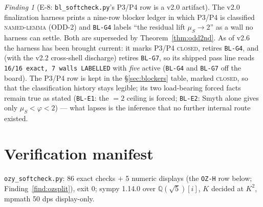 \documentclass[11pt]{article}
\newcommand{\hx}[1]{\textcolor{cC}{\footnotesize\texttt{#1}}}
\newcommand{\Q}{\mathbb{Q}}
\newcommand{\gp}{\varphi}
\theoremstyle{plain}
\theoremstyle{definition}
\theoremstyle{remark}
\newtheorem{finding}[theorem]{Finding}
\begin{document}
\begin{finding}[E-8: \texttt{bl\_softcheck.py}'s P3/P4 row is a v2.0 artifact]\label{find:blstale}
The v2.0 finalization harness prints a nine-row blocker ledger in which P3/P4 is
classified \textsc{named-lemma} (ODD-2) and \hx{BL-G4} labels ``the residual
lift $\mu_S\to2$'' as a wall no harness can settle. Both are superseded by
Theorem~\ref{thm:odd2nd}. As of v2.6 the harness has been brought current: it
marks P3/P4 \textsc{closed}, retires \hx{BL-G4}, and (with the v2.2 cross-shell
discharge) retires \hx{BL-G7}, so its shipped pass line reads \texttt{16/16
exact, 7 walls LABELLED} with \emph{five} active (\hx{BL-G4} and \hx{BL-G7} off
the board). The P3/P4 row is kept in the \S\ref{sec:blockers} table, marked
\textsc{closed}, so that the classification history stays legible; its two
load-bearing forced facts remain true as stated (\hx{BL-E1}: the $=2$ ceiling is
forced; \hx{BL-E2}: Smyth alone gives only $\mu_S<\gp<2$) --- what lapses is the
inference that no further internal route existed.
\end{finding}

\section{Verification manifest}\label{sec:verification}

\texttt{ozy\_softcheck.py}: 86 exact checks $+$ 5 numeric displays (the
\hx{OZ-H} row below; Finding~\ref{find:ozsplit}), exit 0; sympy 1.14.0 over
$\Q(\sqrt5)[i]$, $K$ decided at $K^2$, mpmath 50 dps display-only.
\end{document}
